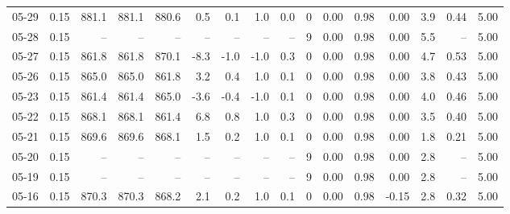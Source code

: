 \begin{threeparttable}
{\begin{tabular}{lrrrrrrrrrrrrrrr}
  05-29 &     0.15 & 881.1 & 881.1 & 880.6 &        0.5 &            0.1 &                      1.0 &                 0.0 &              0 &       0.00 &      0.98 &           0.00 &              3.9 &            0.44 &                   5.00 \\
  05-28 &     0.15 &    -- &    -- &    -- &         -- &             -- &                       -- &                  -- &              9 &       0.00 &      0.98 &           0.00 &              5.5 &              -- &                   5.00 \\
  05-27 &     0.15 & 861.8 & 861.8 & 870.1 &       -8.3 &           -1.0 &                     -1.0 &                 0.3 &              0 &       0.00 &      0.98 &           0.00 &              4.7 &            0.53 &                   5.00 \\
  05-26 &     0.15 & 865.0 & 865.0 & 861.8 &        3.2 &            0.4 &                      1.0 &                 0.1 &              0 &       0.00 &      0.98 &           0.00 &              3.8 &            0.43 &                   5.00 \\
  05-23 &     0.15 & 861.4 & 861.4 & 865.0 &       -3.6 &           -0.4 &                     -1.0 &                 0.1 &              0 &       0.00 &      0.98 &           0.00 &              4.0 &            0.46 &                   5.00 \\
  05-22 &     0.15 & 868.1 & 868.1 & 861.4 &        6.8 &            0.8 &                      1.0 &                 0.3 &              0 &       0.00 &      0.98 &           0.00 &              3.5 &            0.40 &                   5.00 \\
  05-21 &     0.15 & 869.6 & 869.6 & 868.1 &        1.5 &            0.2 &                      1.0 &                 0.1 &              0 &       0.00 &      0.98 &           0.00 &              1.8 &            0.21 &                   5.00 \\
  05-20 &     0.15 &    -- &    -- &    -- &         -- &             -- &                       -- &                  -- &              9 &       0.00 &      0.98 &           0.00 &              2.8 &              -- &                   5.00 \\
  05-19 &     0.15 &    -- &    -- &    -- &         -- &             -- &                       -- &                  -- &              9 &       0.00 &      0.98 &           0.00 &              2.8 &              -- &                   5.00 \\
  05-16 &     0.15 & 870.3 & 870.3 & 868.2 &        2.1 &            0.2 &                      1.0 &                 0.1 &              0 &       0.00 &      0.98 &          -0.15 &              2.8 &            0.32 &                   5.00 \\

\end{tabular}}
\end{threeparttable}
